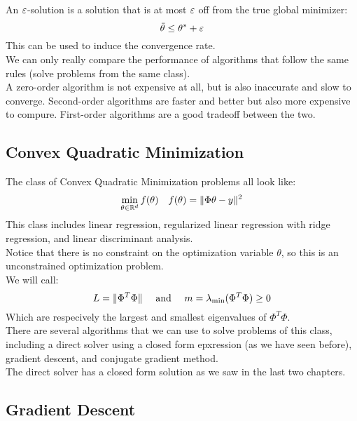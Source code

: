 \documentclass[12pt]{article}
\begin{document}
An $\varepsilon$-solution is a solution that is at
most $\varepsilon$ off from the true global minimizer:
\[ \,\overline{\!{\theta}} \leq \theta^* + \varepsilon \]
This can be used to induce the convergence rate. \\

We can only really compare the performance of algorithms
that follow the same rules (solve problems from the
same class). \\

A zero-order algorithm is not expensive at all,
but is also inaccurate and slow to converge. Second-order
algorithms are faster and better but also more expensive
to compure. First-order algorithms are a good
tradeoff between the two. \\

\newpage

\subsection*{Convex Quadratic Minimization}

The class of Convex Quadratic Minimization problems
all look like:
\[ \min_{\theta \in \mathbb{R}^d} f(\theta)
\quad f(\theta) = \|\Phi \theta - y\|^2 \]
This class includes linear regression, regularized linear 
regression with ridge regression, and linear
discriminant analysis. \\

Notice that there is no constraint on the 
optimization variable $\theta$,
so this is an unconstrained optimization problem. \\

We will call:
\[ L = \|\Phi^T \Phi\| \quad \text{ and }
\quad m = \lambda_{\min}(\Phi^T\Phi) \geq 0 \]
Which are respecively the largest and smallest
eigenvalues of $\Phi^T\Phi$. \\

There are several algorithms that we can use to solve
problems of this class, including
a direct solver using a closed form epxression (as we
have seen before), gradient descent, and conjugate
gradient method. \\

The direct solver has a closed form solution
as we saw in the last two chapters. \\

\newpage

\subsection*{Gradient Descent}
\end{document}
